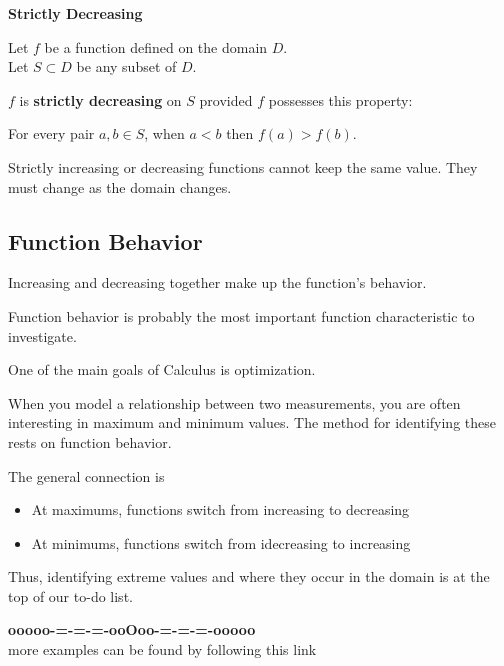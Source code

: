 \documentclass{ximera}
\begin{document}
\begin{definition} \textbf{\textcolor{green!50!black}{Strictly Decreasing}} 


Let $f$ be a function defined on the domain $D$. \\
Let $S \subset D$ be any subset of $D$.

$f$ is \textbf{strictly decreasing} on $S$ provided $f$ possesses this property:  


\begin{center}
For every pair $a, b \in S$, when $a < b$ then $f(a) > f(b)$.
\end{center}

\end{definition}




Strictly increasing or decreasing functions cannot keep the same value.  They must change as the domain changes.





\subsection*{Function Behavior}

Increasing and decreasing together make up the function's behavior.

Function behavior is probably the most important function characteristic to investigate.

One of the main goals of Calculus is optimization.

When you model a relationship between two measurements, you are often interesting in maximum and minimum values.  The method for identifying these rests on function behavior.


The general connection is
\begin{itemize}
\item At maximums, functions switch from increasing to decreasing
\item At minimums, functions switch from idecreasing to increasing
\end{itemize}

Thus, identifying extreme values and where they occur in the domain is at the top of our to-do list.











\begin{center}
\textbf{\textcolor{green!50!black}{ooooo-=-=-=-ooOoo-=-=-=-ooooo}} \\

more examples can be found by following this link\\ 

\end{center}
\end{document}
